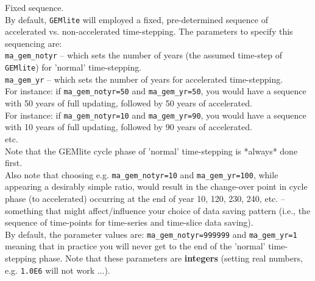 \documentclass[10pt,twoside]{article}
\begin{document}
\begin{compactenum}
        
        \item Fixed sequence.
        \\By default, \texttt{GEMlite} will employed a fixed, pre-determined sequence of accelerated vs. non-accelerated time-stepping. The parameters to specify this sequencing are:
        \\\texttt{ma\_gem\_notyr} -- which sets the number of years (the assumed time-step of \texttt{GEMlite}) for 'normal' time-stepping.
        \\\texttt{ma\_gem\_yr} -- which sets the number of years for accelerated time-stepping.
\\For instance: if \texttt{ma\_gem\_notyr=50} and \texttt{ma\_gem\_yr=50}, you would have a sequence with 50 years of full updating, followed by 50 years of accelerated.
\\For instance: if \texttt{ma\_gem\_notyr=10} and \texttt{ma\_gem\_yr=90}, you would have a sequence with 10 years of full updating, followed by 90 years of accelerated.
\\etc.
\\Note that the GEMlite cycle phase of 'normal' time-stepping is *always* done first.
\\Also note that choosing e.g. \texttt{ma\_gem\_notyr=10} and \texttt{ma\_gem\_yr=100}, while appearing a desirably simple ratio, would result in the change-over point in cycle phase (to accelerated) occurring at the end of year 10, 120, 230, 240, etc. -- something that might affect/influence your choice of data saving pattern (i.e., the sequence of time-points for time-series and time-slice data saving).
\\By default, the parameter values are: \texttt{ma\_gem\_notyr=999999} and \texttt{ma\_gem\_yr=1} meaning that in practice you will never get to the end of the 'normal' time-stepping phase. Note that these parameters are \textbf{integers} (setting real numbers, e.g. \texttt{1.0E6} will not work ...).


\end{compactenum}
\end{document}
